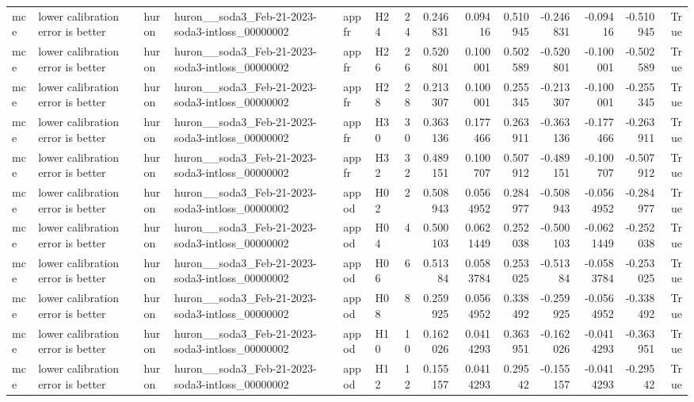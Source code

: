 \begin{longtable}{llllllrrrrrrrr}
mce & lower calibration error is better & huron & huron\_\_soda3\_Feb-21-2023-soda3-intloss\_00000002 & appfr & H24 & 24 & 0.246831 & 0.09416 & 0.510945 & -0.246831 & -0.09416 & -0.510945 & True \\
mce & lower calibration error is better & huron & huron\_\_soda3\_Feb-21-2023-soda3-intloss\_00000002 & appfr & H26 & 26 & 0.520801 & 0.100001 & 0.502589 & -0.520801 & -0.100001 & -0.502589 & True \\
mce & lower calibration error is better & huron & huron\_\_soda3\_Feb-21-2023-soda3-intloss\_00000002 & appfr & H28 & 28 & 0.213307 & 0.100001 & 0.255345 & -0.213307 & -0.100001 & -0.255345 & True \\
mce & lower calibration error is better & huron & huron\_\_soda3\_Feb-21-2023-soda3-intloss\_00000002 & appfr & H30 & 30 & 0.363136 & 0.177466 & 0.263911 & -0.363136 & -0.177466 & -0.263911 & True \\
mce & lower calibration error is better & huron & huron\_\_soda3\_Feb-21-2023-soda3-intloss\_00000002 & appfr & H32 & 32 & 0.489151 & 0.100707 & 0.507912 & -0.489151 & -0.100707 & -0.507912 & True \\
mce & lower calibration error is better & huron & huron\_\_soda3\_Feb-21-2023-soda3-intloss\_00000002 & appod & H02 & 2 & 0.508943 & 0.0564952 & 0.284977 & -0.508943 & -0.0564952 & -0.284977 & True \\
mce & lower calibration error is better & huron & huron\_\_soda3\_Feb-21-2023-soda3-intloss\_00000002 & appod & H04 & 4 & 0.500103 & 0.0621449 & 0.252038 & -0.500103 & -0.0621449 & -0.252038 & True \\
mce & lower calibration error is better & huron & huron\_\_soda3\_Feb-21-2023-soda3-intloss\_00000002 & appod & H06 & 6 & 0.51384 & 0.0583784 & 0.253025 & -0.51384 & -0.0583784 & -0.253025 & True \\
mce & lower calibration error is better & huron & huron\_\_soda3\_Feb-21-2023-soda3-intloss\_00000002 & appod & H08 & 8 & 0.259925 & 0.0564952 & 0.338492 & -0.259925 & -0.0564952 & -0.338492 & True \\
mce & lower calibration error is better & huron & huron\_\_soda3\_Feb-21-2023-soda3-intloss\_00000002 & appod & H10 & 10 & 0.162026 & 0.0414293 & 0.363951 & -0.162026 & -0.0414293 & -0.363951 & True \\
mce & lower calibration error is better & huron & huron\_\_soda3\_Feb-21-2023-soda3-intloss\_00000002 & appod & H12 & 12 & 0.155157 & 0.0414293 & 0.29542 & -0.155157 & -0.0414293 & -0.29542 & True \\

\end{longtable}
